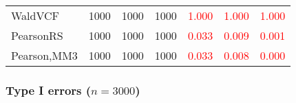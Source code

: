 \documentclass[
]{article}
\begin{document}
\begin{table}[H]
{\begin{tabular}[t]{lrrrrrr}
\hspace{1em}WaldVCF & 1000 & 1000 & 1000 & \textcolor{red}{1.000} & \textcolor{red}{1.000} & \textcolor{red}{1.000}\\
\hspace{1em}PearsonRS & 1000 & 1000 & 1000 & \textcolor{red}{0.033} & \textcolor{red}{0.009} & \textcolor{red}{0.001}\\
\hspace{1em}Pearson,MM3 & 1000 & 1000 & 1000 & \textcolor{red}{0.033} & \textcolor{red}{0.008} & \textcolor{red}{0.000}\\
\bottomrule
\end{tabular}}
\endgroup{}
\end{table}

\hypertarget{type-i-errors-n3000-3}{%
\subsubsection{\texorpdfstring{Type I errors
(\(n=3000\))}{Type I errors (n=3000)}}\label{type-i-errors-n3000-3}}
\end{document}
